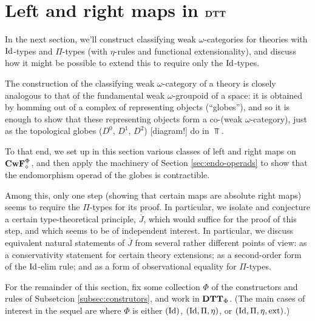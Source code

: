 \documentclass{amsart}
\newcommand{\ext}{\mathrm{ext}}
\newcommand{\Jbar}{\overline{J}}
\newcommand{\stuff}{{\Phi}}
\begin{document}
\section{Left and right maps in $\mathbf{DTT}$}

\para In the next section, we'll construct classifying weak $\omega$-categories for theories with $\mathrm{Id}$-types and $\Pi$-types (with $\eta$-rules and functional extensionality), and discuss how it might be possible to extend this to require only the $\mathrm{Id}$-types.

The construction of the classifying weak $\omega$-category of a theory is closely analogous to that of the fundamental weak $\omega$-groupoid of a space: it is obtained by homming out of a complex of representing objects (``globes''), and so it is enough to show that these representing objects form a co-(weak $\omega$-category), just as the topological globes ($D^0$, $D^1$, $D^2$) [diagram!] do in $\Top$.

To that end, we set up in this section various classes of left and right maps on $\CwF^{\stuff}_\diamond$, and
then apply the machinery of Section \ref{sec:endo-operads} to show that the endomorphism operad of the globes is contractible.

Among this, only one step (showing that certain maps are absolute right maps) seems to require the $\Pi$-types for its proof.  In particular, we isolate and conjecture a certain type-theoretical principle, $\Jbar$, which would suffice for the proof of this step, and which seems to be of independent interest.  In particular, we discuss equivalent natural statements of $\Jbar$ from several rather different points of view: as a conservativity statement for certain theory extensions; as a second-order form of the $\mathrm{Id}$-elim rule; and as a form of observational equality for $\Pi$-types. 



For the remainder of this section, fix some collection $\stuff$ of the constructors and rules of Subsetcion \ref{subsec:construtors}, and work in $\DTT_\stuff$.  (The main cases of interest in the sequel are where $\stuff$ is either $(\mathrm{Id})$, $(\mathrm{Id},\Pi,\eta)$, or $(\Id,\Pi,\eta,\ext)$.)
\end{document}

